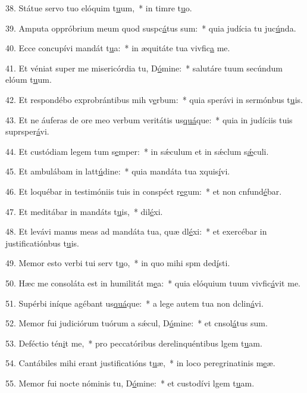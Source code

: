 38. Státue servo tuo elóquim t\uline{u}um,~* in timre t\uline{u}o.\par 
39. Amputa oppróbrium meum quod suspc\uline{á}tus sum:~* quia judícia tu juc\uline{ú}nda.\par 
40. Ecce concupívi mandát t\uline{u}a:~* in æquitáte tua vivfic\uline{a} me.\par 
41. Et véniat super me misericórdia tu, D\uline{ó}mine:~* salutáre tuum secúndum elóum t\uline{u}um.\par 
42. Et respondébo exprobrántibus mih v\uline{e}rbum:~* quia sperávi in sermónbus t\uline{u}is.\par 
43. Et ne áuferas de ore meo verbum veritátis us\uline{quá}que:~* quia in judíciis tuis suprsper\uline{á}vi.\par 
44. Et custódiam legem tum s\uline{e}mper:~* in sǽculum et in sǽclum s\uline{ǽ}culi.\par 
45. Et ambulábam in latt\uline{ú}dine:~* quia mandáta tua xquis\uline{í}vi.\par 
46. Et loquébar in testimóniis tuis in conspéct r\uline{e}gum:~* et non cnfund\uline{é}bar.\par 
47. Et meditábar in mandáts t\uline{u}is,~*  dil\uline{é}xi.\par 
48. Et levávi manus meas ad mandáta tua, quæ dl\uline{é}xi:~* et exercébar in justificatiónbus t\uline{u}is.\par 
49. Memor esto verbi tui serv t\uline{u}o,~* in quo mihi spm ded\uline{í}sti.\par 
50. Hæc me consoláta est in humilitát m\uline{e}a:~* quia elóquium tuum vivfic\uline{á}vit me.\par 
51. Supérbi iníque agébant us\uline{quá}que:~* a lege autem tua non dclin\uline{á}vi.\par 
52. Memor fui judiciórum tuórum a sǽcul, D\uline{ó}mine:~* et cnsol\uline{á}tus sum.\par 
53. Deféctio tén\uline{i}t me,~* pro peccatóribus derelinquéntibus lgem t\uline{u}am.\par 
54. Cantábiles mihi erant justificatións t\uline{u}æ,~* in loco peregrinatinis m\uline{e}æ.\par 
55. Memor fui nocte nóminis tu, D\uline{ó}mine:~* et custodívi lgem t\uline{u}am.\par 
